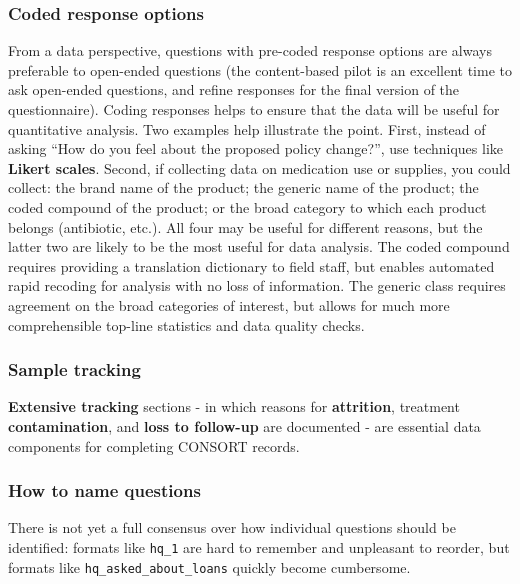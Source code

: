 \subsubsection{Coded response options}
From a data perspective, questions with pre-coded response options are always preferable to open-ended questions (the content-based pilot is an excellent time to ask open-ended questions, and refine responses for the final version of the questionnaire). Coding responses helps to ensure that the data will be useful for quantitative analysis. Two examples help illustrate the point. First, instead of asking ``How do you feel about the proposed policy change?'', use techniques like 
\textbf{Likert scales}. Second, if collecting data on medication use or supplies, you could collect: the brand name of the product; the generic name of the product; the coded compound of the product; or the broad category to which each product belongs (antibiotic, etc.). All four may be useful for different reasons, but the latter two are likely to be the most useful for data analysis. The coded compound requires providing a translation dictionary to field staff, but enables automated rapid recoding for analysis with no loss of information. The generic class requires agreement on the broad categories of interest, but allows for much more comprehensible top-line statistics and data quality checks.

\subsubsection{Sample tracking}
\textbf{Extensive tracking} sections - in which reasons for \textbf{attrition}, treatment \textbf{contamination}, and \textbf{loss to follow-up} are documented -
are essential data components for completing CONSORT
records.

\subsubsection{How to name questions}
There is not yet a full consensus over how individual questions should be identified:
formats like \texttt{hq\_1} are hard to remember and unpleasant to reorder,
but formats like \texttt{hq\_asked\_about\_loans} quickly become cumbersome.

